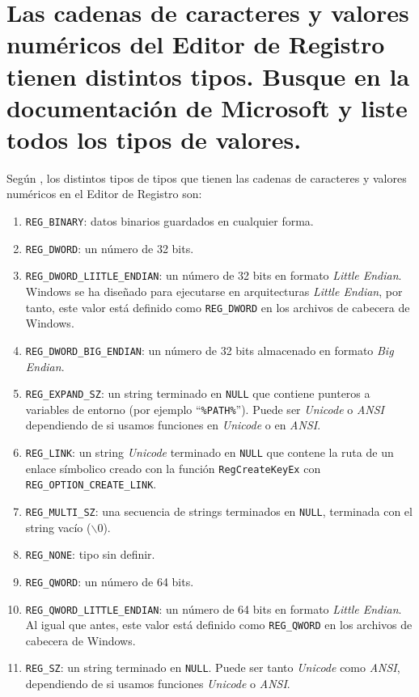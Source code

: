 \documentclass[10pt,a4paper,spanish]{article}
\numberwithin{equation}{section} %
\numberwithin{figure}{section} %
\numberwithin{table}{section} %
\begin{document}
\section{Las cadenas de caracteres y valores numéricos del Editor de Registro tienen distintos tipos. Busque en la documentación de Microsoft y liste todos los tipos de valores.}
Según \cite{regtypes}, los distintos tipos de tipos que tienen las cadenas de caracteres y valores numéricos en el Editor de Registro son:
\begin{enumerate}[$\bullet$]
    \item \texttt{REG\_BINARY}: datos binarios guardados en cualquier forma.
    \item \texttt{REG\_DWORD}: un número de 32 bits.
    \item \texttt{REG\_DWORD\_LIITLE\_ENDIAN}: un número de 32 bits en formato \textit{Little Endian}. Windows se ha diseñado para ejecutarse en arquitecturas \textit{Little Endian}, por tanto, este valor está definido como \texttt{REG\_DWORD} en los archivos de cabecera de Windows.
    \item \texttt{REG\_DWORD\_BIG\_ENDIAN}: un número de 32 bits almacenado en formato \textit{Big Endian}.
    \item \texttt{REG\_EXPAND\_SZ}: un string terminado en \texttt{NULL} que contiene punteros a variables de entorno (por ejemplo ``\texttt{\%PATH\%}''). Puede ser \textit{Unicode} o \textit{ANSI} dependiendo de si usamos funciones en \textit{Unicode} o en \textit{ANSI}.
    \item \texttt{REG\_LINK}: un string \textit{Unicode} terminado en \texttt{NULL} que contene la ruta de un enlace símbolico creado con la función \texttt{RegCreateKeyEx} con \texttt{REG\_OPTION\_CREATE\_LINK}.
    \item \texttt{REG\_MULTI\_SZ}:  una secuencia de strings terminados en \texttt{NULL}, terminada con el string vacío ($\backslash0$).
    \item \texttt{REG\_NONE}: tipo sin definir.
    \item \texttt{REG\_QWORD}: un número de 64 bits.
    \item \texttt{REG\_QWORD\_LITTLE\_ENDIAN}: un número de 64 bits en formato \textit{Little Endian}. Al igual que antes, este valor está definido como \texttt{REG\_QWORD} en los archivos de cabecera de Windows.
    \item \texttt{REG\_SZ}: un string terminado en \texttt{NULL}. Puede ser tanto \textit{Unicode} como \textit{ANSI}, dependiendo de si usamos funciones \textit{Unicode} o \textit{ANSI}.
\end{enumerate}
\end{document}
